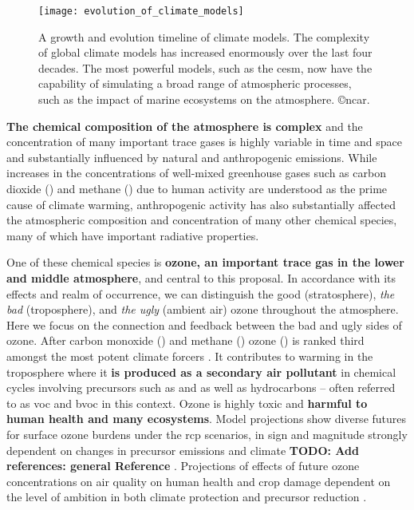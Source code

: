 \begin{figure}[!ht]
  \centering
  \texttt{[image: evolution\_of\_climate\_models]}
  \caption{A growth and evolution timeline of climate models. The complexity of global climate models has increased enormously over the last four decades. The most powerful models, such as the \gls{cesm}, now have the capability of simulating a broad range of atmospheric processes, such as the impact of marine ecosystems on the atmosphere. \copyright \gls{ncar}.}
  \label{fig:growth_esm}
  \vspace*{-10pt}
\end{figure}


\textbf{The chemical composition of the atmosphere is complex} and the concentration of many important trace gases is highly variable in time and space and substantially influenced by natural and anthropogenic emissions. While increases in the concentrations of well-mixed greenhouse gases such as carbon dioxide () and methane () due to human activity are understood as the prime cause of climate warming, anthropogenic activity has also substantially affected the atmospheric composition and concentration of many other chemical species, many of which have important radiative properties.

One of these chemical species is \textbf{ozone, an important trace gas in the lower and middle atmosphere}, and central to this proposal. In accordance with its effects and realm of occurrence, we can distinguish the good (stratosphere), \emph{the bad} (troposphere), and \emph{the ugly} (ambient air) ozone throughout the atmosphere. Here we focus on the connection and feedback between the bad and ugly sides of ozone. After carbon monoxide () and methane () ozone () is ranked third amongst the most potent climate forcers \parencite{IPCC2013c8}.
It contributes to warming in the troposphere where it \textbf{is produced as a secondary air pollutant} in chemical cycles involving precursors such as  and  as well as hydrocarbons -- often referred to as \gls{voc} and \gls{bvoc} in this context. Ozone is highly toxic and \textbf{harmful to human health and many ecosystems}. Model projections show diverse futures for surface ozone burdens under the \gls{rcp} scenarios, in sign and magnitude strongly dependent on changes in precursor emissions and climate \textbf{\color{red}TODO: Add references: general Reference} \parencites{JGR:Rieder2015}{AE:Rieder2018}{Nat:Skeie2020}. Projections of effects of future ozone concentrations on air quality on human health and crop damage dependent on the level of ambition in both climate protection and precursor reduction \parencite{PTRS:Schneidemesser2020}.

